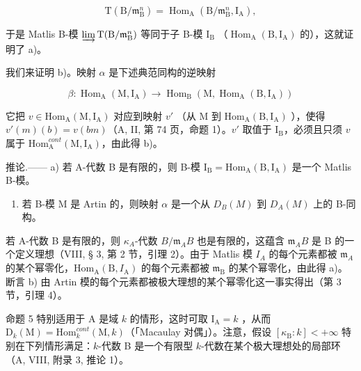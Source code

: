 \[
\mathrm{T} (\mathrm{B} / \mathfrak {m} _ {\mathrm{B}} ^ {n}) = \operatorname{Hom} _ {\mathrm{A}} (\mathrm{B} / \mathfrak {m} _ {\mathrm{B}} ^ {n}, \mathrm{I} _ {\mathrm{A}}),
\]

于是 Matlis B-模 \(\varinjlim\mathrm{T}(\mathrm{B}/\mathfrak{m}_{\mathrm{B}}^{n})\) 等同于子 B-模 \(\mathrm{I}_{\mathrm{B}}\) （\(\operatorname{Hom}_{\mathrm{A}}(\mathrm{B},\mathrm{I}_{\mathrm{A}})\) 的），这就证明了 a)。

我们来证明 b)。映射 \(\alpha\) 是下述典范同构的逆映射

\[
\beta : \operatorname{Hom} _ {\mathrm{A}} (\mathrm{M}, \mathrm{I} _ {\mathrm{A}}) \longrightarrow \operatorname{Hom} _ {\mathrm{B}} (\mathrm{M}, \operatorname{Hom} _ {\mathrm{A}} (\mathrm{B}, \mathrm{I} _ {\mathrm{A}}))
\]

它把 \(v \in \mathrm{Hom}_{\mathrm{A}}(\mathrm{M}, \mathrm{I}_{\mathrm{A}})\) 对应到映射 \(v'\) （从 M 到 \(\mathrm{Hom}_{\mathrm{A}}(\mathrm{B}, \mathrm{I}_{\mathrm{A}})\) ），使得 \(v'(m)(b) = v(bm)\)（A, II, 第 74 页，命题 1）。\(v'\) 取值于 \(\mathrm{I}_{\mathrm{B}}\)，必须且只须 \(v\) 属于 \(\mathrm{Hom}_{\mathrm{A}}^{cont}(\mathrm{M}, \mathrm{I}_{\mathrm{A}})\)，由此得 b)。

推论.—— a) 若 A-代数 B 是有限的，则 B-模 \(\mathrm{I_B} = \mathrm{Hom}_{\mathrm{A}}(\mathrm{B},\mathrm{I}_{\mathrm{A}})\) 是一个 Matlis B-模。

\begin{enumerate}
\def\labelenumi{\alph{enumi})}
\setcounter{enumi}{1}
\tightlist
\item
  若 B-模 M 是 Artin 的，则映射 \(\alpha\) 是一个从 \(D_{B}(M)\) 到 \(D_{A}(M)\) 上的 B-同构。
\end{enumerate}

若 A-代数 B 是有限的，则 \(\kappa_{A}\)-代数 \(B/\mathfrak{m}_{A}B\) 也是有限的，这蕴含 \(\mathfrak{m}_{A}B\) 是 B 的一个定义理想（VIII, § 3, 第 2 节，引理 2）。由于 Matlis 模 \(I_{A}\) 的每个元素都被 \(\mathfrak{m}_{A}\) 的某个幂零化，\(\mathrm{Hom}_{\mathrm{A}}(\mathrm{B}, I_{\mathrm{A}})\) 的每个元素都被 \(\mathfrak{m}_{\mathrm{B}}\) 的某个幂零化，由此得 a)。断言 b) 由 Artin 模的每个元素都被极大理想的某个幂零化这一事实得出（第 3 节，引理 4）。

命题 5 特别适用于 A 是域 \(k\) 的情形，这时可取 \(\mathrm{I}_{\mathrm{A}} = k\) ，从而 \(\mathrm{D}_{k}(\mathrm{M}) = \mathrm{Hom}_{k}^{cont}(\mathrm{M}, k)\)（「Macaulay 对偶」）。注意，假设 \([\kappa_{\mathrm{B}} : k] < +\infty\) 特别在下列情形满足：\(k\)-代数 B 是一个有限型 \(k\)-代数在某个极大理想处的局部环（A, VIII, 附录 3, 推论 1）。

